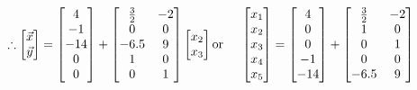 \documentclass[11pt,a4paper]{article}
\begin{document}
\[\therefore \begin{bmatrix}
            \Vec{x}\\\Vec{y}
            \end{bmatrix} =
\begin{bmatrix}
4\\-1\\-14\\0\\0
\end{bmatrix} + 
\begin{bmatrix}
\frac{3}{2} & -2\\
0 & 0\\
-6.5 & 9\\
1 & 0 \\
0 & 1
\end{bmatrix} 
\begin{bmatrix}
x_2\\x_3
\end{bmatrix}\\

\text{or}~~~~
\begin{bmatrix}
x_1\\x_2\\x_3\\x_4\\x_5
\end{bmatrix} = 
\begin{bmatrix}
4 \\ 0 \\ 0 \\ -1 \\ -14
\end{bmatrix} + 
\begin{bmatrix}
\frac{3}{2} & -2\\
1 & 0\\
0 & 1\\
0 & 0\\
-6.5 & 9
\end{bmatrix}

\]
\end{document}
